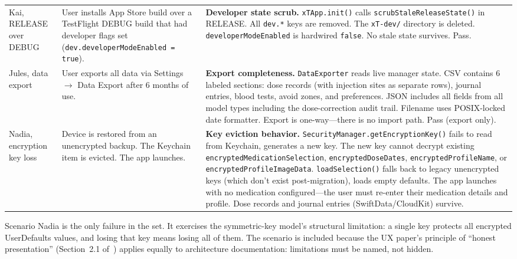 \documentclass[11pt,a4paper]{article}
\newcommand{\bad}[1]{\obs{#1}}
\newcommand{\good}[1]{#1}
\newcommand{\code}[1]{\texttt{\small #1}}
\begin{document}
\begin{longtable}{@{}p{2.6cm}p{5.0cm}p{6.9cm}@{}}
Kai, RELEASE over DEBUG &
  User installs App Store build over a TestFlight DEBUG build that had
  developer flags set (\code{dev.developerModeEnabled = true}).
  & \textbf{Developer state scrub.} \code{xTApp.init()} calls
    \code{scrubStaleReleaseState()} in RELEASE. All \code{dev.*} keys are
    removed. The \verb|xT-dev/| directory is deleted.
    \code{developerModeEnabled} is hardwired \code{false}. No stale state
    survives. \good{Pass.} \\[0.4em]

Jules, data export &
  User exports all data via Settings $\to$ Data Export after 6 months of
  use.
  & \textbf{Export completeness.} \code{DataExporter} reads live manager
    state. CSV contains 6 labeled sections: dose records (with injection
    sites as separate rows), journal entries, blood tests, avoid zones, and
    preferences. JSON includes all fields from all model types including
    the dose-correction audit trail. Filename uses POSIX-locked date
    formatter. Export is one-way---there is no import path. \good{Pass
    (export only).} \\[0.4em]

Nadia, encryption key loss &
  Device is restored from an unencrypted backup. The Keychain item is
  evicted. The app launches.
  & \textbf{Key eviction behavior.}
    \code{SecurityManager.getEncryptionKey()} fails to read from Keychain,
    generates a new key. The new key cannot decrypt existing
    \code{encryptedMedicationSelection}, \code{encryptedDoseDates},
    \code{encryptedProfileName}, or \code{encryptedProfileImageData}.
    \code{loadSelection()} falls back to legacy unencrypted keys (which
    don't exist post-migration), loads empty defaults. The app launches
    with no medication configured---the user must re-enter their
    medication details and profile. Dose records and journal entries
    (SwiftData/CloudKit) survive. \bad{Fail with data loss.} \\
\bottomrule
\end{longtable}

Scenario Nadia is the only failure in the set. It exercises the
symmetric-key model's structural limitation: a single key protects all
encrypted UserDefaults values, and losing that key means losing all of them.
The scenario is included because the UX paper's principle of ``honest
presentation'' (Section~2.1 of~\cite{xtux}) applies equally to architecture
documentation: limitations must be named, not hidden.

\end{document}
